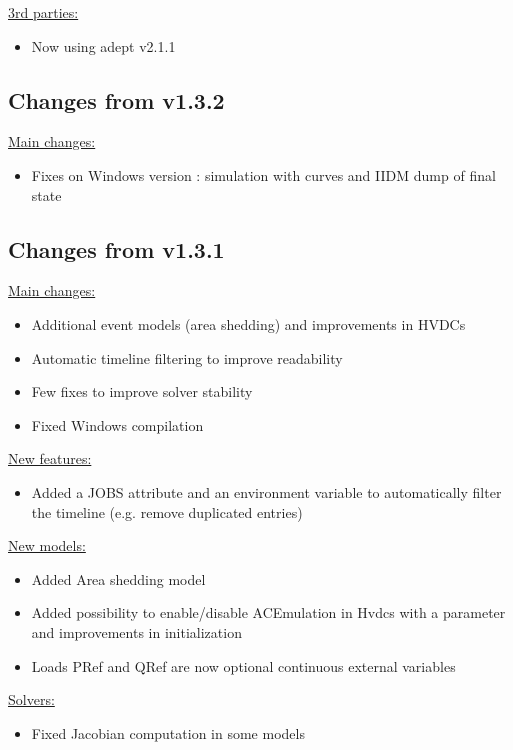 \documentclass[a4paper, 12pt]{report}
\begin{document}
\underline{3rd parties:}\begin{itemize}
\item Now using adept v2.1.1
\end{itemize}

\subsection{Changes from v1.3.2}

\underline{Main changes:}
\begin{itemize}
\item Fixes on Windows version : simulation with curves and IIDM dump of final state
\end{itemize}

\subsection{Changes from v1.3.1}

\underline{Main changes:}
\begin{itemize}
\item Additional event models (area shedding) and improvements in HVDCs
\item Automatic timeline filtering to improve readability
\item Few fixes to improve solver stability
\item Fixed Windows compilation
\end{itemize}

\underline{New features:}
\begin{itemize}
\item Added a JOBS attribute and an environment variable to automatically filter the timeline (e.g. remove duplicated entries)
\end{itemize}

\underline{New models:}
\begin{itemize}
\item Added Area shedding model
\item Added possibility to enable/disable ACEmulation in Hvdcs with a parameter and improvements in initialization
\item Loads PRef and QRef are now optional continuous external variables
\end{itemize}

\underline{Solvers:}
\begin{itemize}
\item Fixed Jacobian computation in some models
\end{itemize}
\end{document}
